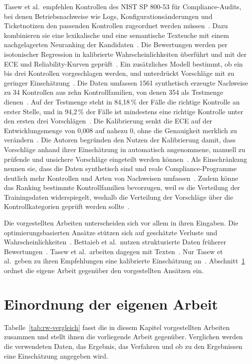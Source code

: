 Tasew et al.\ empfehlen Kontrollen des NIST SP 800-53 für Compliance-Audits, bei denen Betriebsnachweise wie Logs, Konfigurationsänderungen und Ticketnotizen den passenden Kontrollen zugeordnet werden müssen~\cite[S.~1]{Tasew2026}.
Dazu kombinieren sie eine lexikalische und eine semantische Textsuche mit einem nachgelagerten Neuranking der Kandidaten~\cite[S.~2]{Tasew2026}.
Die Bewertungen werden per isotonischer Regression in kalibrierte Wahrscheinlichkeiten überführt und mit der ECE und Reliability-Kurven geprüft~\cite[S.~2]{Tasew2026}.
Ein zusätzliches Modell bestimmt, ob ein bis drei Kontrollen vorgeschlagen werden, und unterdrückt Vorschläge mit zu geringer Einschätzung~\cite[S.~2]{Tasew2026}.
Die Daten umfassen 1561 synthetisch erzeugte Nachweise zu 34 Kontrollen aus zehn Kontrollfamilien, von denen 354 als Testmenge dienen~\cites[S.~7]{Tasew2026}[S.~11]{Tasew2026}.
Auf der Testmenge steht in 84,18\,\% der Fälle die richtige Kontrolle an erster Stelle, und in 94,2\,\% der Fälle ist mindestens eine richtige Kontrolle unter den ersten drei Vorschlägen~\cite[S.~1]{Tasew2026}.
Die Kalibrierung senkt die ECE auf der Entwicklungsmenge von 0,008 auf nahezu 0, ohne die Genauigkeit merklich zu verändern~\cite[S.~13, 16]{Tasew2026}.
Die Autoren begründen den Nutzen der Kalibrierung damit, dass Vorschläge anhand ihrer Einschätzung in automatisch angenommene, manuell zu prüfende und unsichere Vorschläge eingeteilt werden können~\cite[S.~16]{Tasew2026}.
Als Einschränkung nennen sie, dass die Daten synthetisch sind und reale Compliance-Programme deutlich mehr Kontrollen und Arten von Nachweisen umfassen~\cite[S.~18]{Tasew2026}.
Zudem könne das Ranking bestimmte Kontrollfamilien bevorzugen, weil es die Verteilung der Trainingsdaten widerspiegelt, weshalb die Verteilung der Vorschläge über die Kontrollkategorien geprüft werden sollte~\cite[S.~20]{Tasew2026}.

Die vorgestellten Arbeiten unterscheiden sich vor allem in ihren Eingaben.
Die optimierungsbasierten Ansätze stützen sich auf geschätzte Verluste und Wahrscheinlichkeiten~\cites[S.~178]{Almeida2018}[S.~92]{Zhang2018}.
Bettaieb et al.\ nutzen strukturierte Daten früherer Bewertungen~\cite[S.~2559--2563]{Bettaieb2020}.
Tasew et al.\ arbeiten dagegen mit Texten~\cite[S.~1]{Tasew2026}.
Nur Tasew et al.\ geben zu ihren Empfehlungen eine kalibrierte Einschätzung an~\cite[S.~2]{Tasew2026}.
Abschnitt~\ref{sec:rw-abgrenzung} ordnet die eigene Arbeit gegenüber den vorgestellten Ansätzen ein.

\section{Einordnung der eigenen Arbeit}\label{sec:rw-abgrenzung}
Tabelle~\ref{tab:rw-vergleich} fasst die in diesem Kapitel vorgestellten Arbeiten zusammen und stellt ihnen die vorliegende Arbeit gegenüber.
Verglichen werden die verwendeten Daten, das Ergebnis, das Verfahren und ob zu den Ergebnissen eine Einschätzung angegeben wird.


